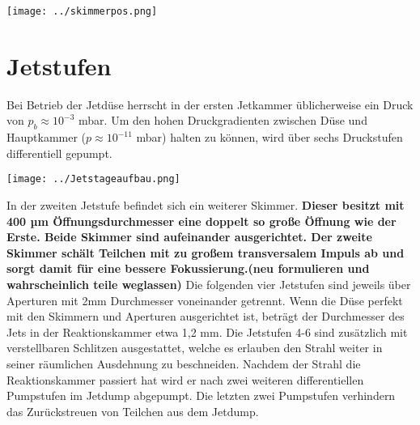 \begin{center}
\begin{minipage}{\linewidth}
\centering
\texttt{[image: ../skimmerpos.png]}%
 \label{fig:Skimmerpos}
\end{minipage} 
\end{center} 


\section{Jetstufen} \label{sec:Jetstufen}

Bei Betrieb der Jetdüse herrscht in der ersten Jetkammer üblicherweise ein Druck von $p_b \approx 10^{-3}$ mbar. Um den hohen Druckgradienten zwischen Düse und Hauptkammer ($p \approx 10^{-11}$ mbar) halten zu können, wird über sechs Druckstufen differentiell gepumpt.

\begin{center}
\begin{minipage}{\linewidth}
\centering
\texttt{[image: ../Jetstageaufbau.png]}%
 \label{fig:Jetstageaufbau}
\end{minipage} 
\end{center} 

In der zweiten Jetstufe befindet sich ein weiterer Skimmer. \textbf{Dieser besitzt mit 400 µm Öffnungsdurchmesser eine doppelt so große Öffnung wie der Erste. Beide Skimmer sind aufeinander ausgerichtet. Der zweite Skimmer schält Teilchen mit zu großem transversalem Impuls ab und sorgt damit für eine bessere Fokussierung.(neu formulieren und wahrscheinlich teile weglassen)} Die folgenden vier Jetstufen sind jeweils über Aperturen mit 2mm Durchmesser voneinander getrennt. Wenn die Düse perfekt mit den Skimmern und Aperturen ausgerichtet ist, beträgt der Durchmesser des Jets in der Reaktionskammer etwa 1,2 mm. Die Jetstufen 4-6 sind zusätzlich mit verstellbaren Schlitzen ausgestattet, welche es erlauben den Strahl weiter in seiner räumlichen Ausdehnung zu beschneiden. Nachdem der Strahl die Reaktionskammer passiert hat wird er nach zwei weiteren differentiellen Pumpstufen im Jetdump abgepumpt. Die letzten zwei Pumpstufen verhindern das Zurückstreuen von Teilchen aus dem Jetdump.